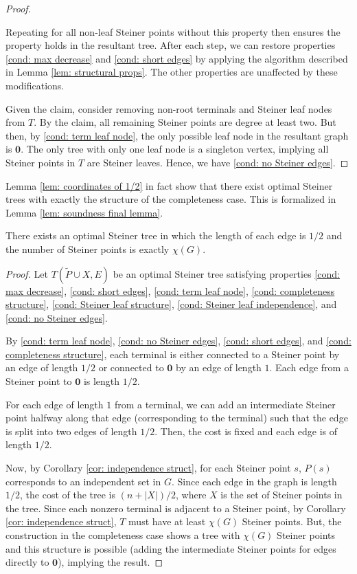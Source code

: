 \documentclass{theoretics}
\newcommand{\1}{\textbf{1}}
\renewcommand{\tilde}{\widetilde}
\begin{document}
\begin{proof}
\begin{subproof}
Repeating for all non-leaf Steiner points without this property then ensures the property holds in the resultant tree. After each step, we can restore properties \ref{cond: max decrease} and \ref{cond: short edges} by applying the algorithm described in Lemma \ref{lem: structural props}. The other properties are unaffected by these modifications.
\end{subproof}
Given the claim, consider removing non-root terminals and Steiner leaf nodes from $T$. By the claim, all remaining Steiner points are degree at least two. But then, by \ref{cond: term leaf node}, the only possible leaf node in the resultant graph is $\mathbf{0}$. The only tree with only one leaf node is a singleton vertex, implying all Steiner points in $T$ are Steiner leaves. Hence, we have \ref{cond: no Steiner edges}.
\end{proof}

Lemma \ref{lem: coordinates of 1/2} in fact show that there exist optimal Steiner trees with exactly the structure of the completeness case. This is formalized in Lemma \ref{lem: soundness final lemma}.
\begin{lemma} \label{lem: soundness final lemma}
There exists an optimal Steiner tree in which the length of each edge is $1/2$ and the number of Steiner points is exactly $\chi(G)$.
\end{lemma}
\begin{proof}
Let $T(\tilde{P} \cup X, E)$ be an optimal Steiner tree satisfying properties \ref{cond: max decrease}, \ref{cond: short edges}, \ref{cond: term leaf node}, \ref{cond: completeness structure}, \ref{cond: Steiner leaf structure}, \ref{cond: Steiner leaf independence}, and \ref{cond: no Steiner edges}. 

By \ref{cond: term leaf node}, \ref{cond: no Steiner edges}, \ref{cond: short edges}, and \ref{cond: completeness structure}, each terminal is either connected to a Steiner point by an edge of length $1/2$ or connected to $\mathbf{0}$ by an edge of length $1$. Each edge from a Steiner point to $\mathbf{0}$ is length $1/2$. 

 For each edge of length $1$ from a terminal, we can add an intermediate Steiner point halfway along that edge (corresponding to the terminal) such that the edge is split into two edges of length $1/2$. Then, the cost is fixed and each edge is of length $1/2$.

Now, by Corollary \ref{cor: independence struct}, for each Steiner point $s$, $P(s)$ corresponds to an independent set in $G$. Since each edge in the graph is length $1/2$, the cost of the tree is $(n + |X|)/2$, where $X$ is the set of Steiner points in the tree. Since each nonzero terminal is adjacent to a Steiner point, by Corollary \ref{cor: independence struct}, $T$ must have at least $\chi(G)$ Steiner points. But, the construction in the completeness case shows a tree with $\chi(G)$ Steiner points and this structure is possible (adding the intermediate Steiner points for edges directly to $\mathbf{0}$), implying the result.
\end{proof}
\end{document}
